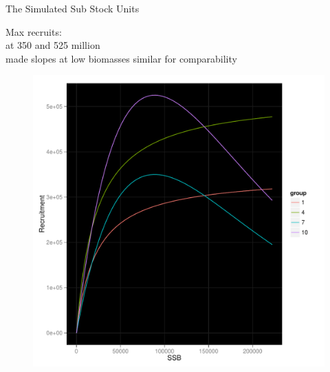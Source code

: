 \documentclass{beamer}
\begin{document}
\begin{withoutheadline}
\begin{frame}{The Simulated Sub Stock Units}
  \begin{minipage}{.3\textwidth}
   Max recruits: \\
   at 350 and 525 million \\

   \vspace{.25cm}   
   made slopes at low biomasses similar
   for comparability
  \end{minipage}
  \hspace{0.25cm}  
  \begin{minipage}{.65\textwidth}
  \begin{figure}
  \flushleft
  \includegraphics[width=\textwidth]{LH-choices2}
  \end{figure}
  \end{minipage}
\end{frame}
\end{withoutheadline}


\end{document}
